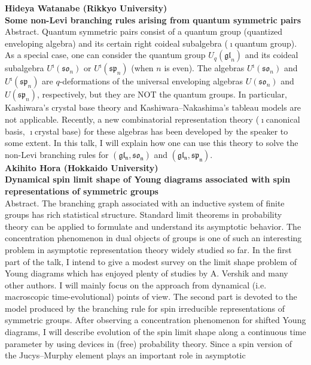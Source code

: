 \documentclass[12pt,landscape]{jarticle}
\begin{document}
\noindent
{\bf\large Hideya Watanabe (Rikkyo University)} \\
{\bf Some non-Levi branching rules arising from quantum symmetric pairs} \\[1mm]
Abstract. 
Quantum symmetric pairs consist of a quantum group (quantized enveloping algebra) and its certain right coideal subalgebra ($\imath$quantum group).
As a special case, one can consider the quantum group $U_q(\mathfrak{gl}_n)$ and its coideal subalgebra $U^\imath(\mathfrak{so}_n)$ or $U^\imath(\mathfrak{sp}_n)$ (when $n$ is even).
The algebras $U^\imath(\mathfrak{so}_n)$ and $U^\imath(\mathfrak{sp}_n)$ are $q$-deformations of the universal enveloping algebras $U(\mathfrak{so}_n)$ and $U(\mathfrak{sp}_n)$, respectively, but they are NOT the quantum groups.
In particular, Kashiwara's crystal base theory and Kashiwara--Nakashima's tableau models are not applicable.
Recently, a new combinatorial representation theory ($\imath$canonical basis, $\imath$crystal base) for these algebras has been developed by the speaker to some extent.
In this talk, I will explain how one can use this theory to solve the non-Levi branching rules for $(\mathfrak{gl_n}, \mathfrak{so_n})$ and $(\mathfrak{gl_n}, \mathfrak{sp_n})$.
\\[5mm]
{\bf\large Akihito Hora (Hokkaido University)} \\ 
{\bf Dynamical spin limit shape of Young diagrams associated with spin representations of symmetric groups} \\[1mm]
Abstract. 
The branching graph associated with an inductive system of finite groups has rich 
statistical structure. Standard limit theorems in probability theory can be applied to formulate and understand its asymptotic behavior. The concentration phenomenon in dual objects of groups is one of such an interesting problem in asymptotic representation theory widely studied so far. In the first part of the talk, I intend to give a modest survey on the limit shape problem of Young diagrams which has enjoyed plenty of studies by A. Vershik and many other authors. I will mainly focus on the approach from dynamical (i.e. macroscopic time-evolutional) points of view. The second part is devoted to the model produced by the branching rule for spin irreducible representations of symmetric groups. After observing a concentration phenomenon for shifted Young diagrams, I will describe evolution of the spin limit shape along a continuous time parameter by using devices in (free) probability theory. 
Since a spin version of the Jucys--Murphy element plays an important role in asymptotic 
\end{document}
